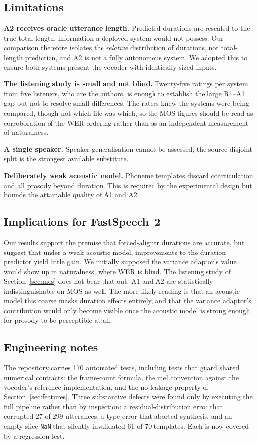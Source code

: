 \documentclass[conference]{IEEEtran}
\begin{document}
\subsection{Limitations}
\label{sec:limits}
\textbf{A2 receives oracle utterance length.} Predicted durations are rescaled to the true total
length, information a deployed system would not possess. Our comparison therefore isolates the
\emph{relative} distribution of durations, not total-length prediction, and A2 is not a fully
autonomous system. We adopted this to ensure both systems present the vocoder with
identically-sized inputs.

\textbf{The listening study is small and not blind.} Twenty-five ratings per system from five
listeners, who are the authors, is enough to establish the large R1--A1 gap but not to resolve
small differences. The raters knew the systems were being compared, though not which file was
which, so the MOS figures should be read as corroboration of the WER ordering rather than as an
independent measurement of naturalness.

\textbf{A single speaker.} Speaker generalisation cannot be assessed; the source-disjoint split is
the strongest available substitute.

\textbf{Deliberately weak acoustic model.} Phoneme templates discard coarticulation and all
prosody beyond duration. This is required by the experimental design but bounds the attainable
quality of A1 and A2.

\subsection{Implications for FastSpeech~2}
Our results support the premise that forced-aligner durations are accurate, but suggest that under
a weak acoustic model, improvements to the duration predictor yield little gain. We initially
supposed the variance adaptor's value would show up in naturalness, where WER is blind. The
listening study of Section~\ref{sec:mos} does not bear that out: A1 and A2 are statistically
indistinguishable on MOS as well. The more likely reading is that an acoustic model this coarse
masks duration effects entirely, and that the variance adaptor's contribution would only become
visible once the acoustic model is strong enough for prosody to be perceptible at all.

\subsection{Engineering notes}
The repository carries 170 automated tests, including tests that guard shared numerical contracts:
the frame-count formula, the mel convention against the vocoder's reference implementation, and
the no-leakage property of Section~\ref{sec:features}. Three substantive defects were found only
by executing the full pipeline rather than by inspection: a residual-distribution error that
corrupted 27 of 299 utterances, a type error that aborted synthesis, and an empty-slice
\texttt{NaN} that silently invalidated 61 of 70 templates. Each is now covered by a regression
test.
\end{document}
